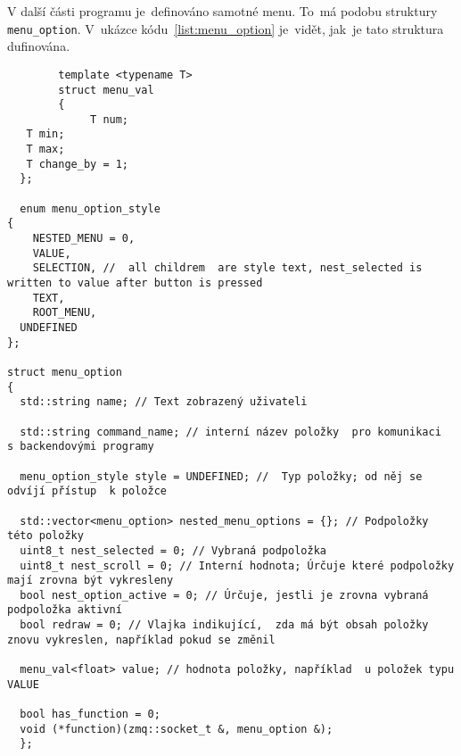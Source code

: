 V další části programu je~definováno samotné menu. To~má podobu struktury \texttt{menu_option}.  V~ukázce kódu~\ref{list:menu_option}  je~vidět,  jak~je tato struktura dufinována.
\begin{code}
    \begin{verbatim}
        template <typename T>
        struct menu_val
        {
             T num;
   T min;
   T max;
   T change_by = 1;
  };
  
  enum menu_option_style
{
    NESTED_MENU = 0,
    VALUE,
    SELECTION, //  all childrem  are style text, nest_selected is written to value after button is pressed
    TEXT,
    ROOT_MENU,
  UNDEFINED
};

struct menu_option
{
  std::string name; // Text zobrazený uživateli

  std::string command_name; // interní název položky  pro komunikaci  s backendovými programy

  menu_option_style style = UNDEFINED; //  Typ položky; od něj se odvíjí přístup  k položce

  std::vector<menu_option> nested_menu_options = {}; // Podpoložky této položky
  uint8_t nest_selected = 0; // Vybraná podpoložka
  uint8_t nest_scroll = 0; // Interní hodnota; Úrčuje které podpoložky mají zrovna být vykresleny
  bool nest_option_active = 0; // Úrčuje, jestli je zrovna vybraná podpoložka aktivní
  bool redraw = 0; // Vlajka indikující,  zda má být obsah položky znovu vykreslen, například pokud se změnil

  menu_val<float> value; // hodnota položky, například  u položek typu VALUE

  bool has_function = 0;
  void (*function)(zmq::socket_t &, menu_option &);
  };
\end{verbatim}
\end{code}


